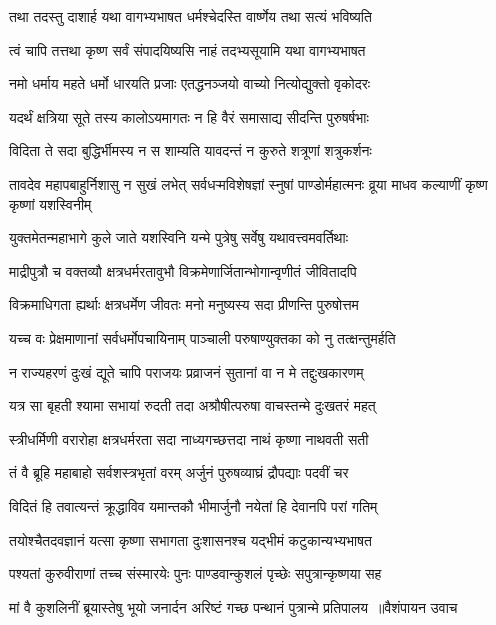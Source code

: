 \twolineshloka
{तथा तदस्तु दाशार्ह यथा वागभ्यभाषत}
{धर्मश्चेदस्ति वार्ष्णेय तथा सत्यं भविष्यति}


\twolineshloka
{त्वं चापि तत्तथा कृष्ण सर्वं संपादयिष्यसि}
{नाहं तदभ्यसूयामि यथा वागभ्यभाषत}


\twolineshloka
{नमो धर्माय महते धर्मो धारयति प्रजाः}
{एतद्धनञ्जयो वाच्यो नित्योद्युक्तो वृकोदरः}


\twolineshloka
{यदर्थं क्षत्रिया सूते तस्य कालोऽयमागतः}
{न हि वैरं समासाद्य सीदन्ति पुरुषर्षभाः}


\twolineshloka
{विदिता ते सदा बुद्धिर्भीमस्य न स शाम्यति}
{यावदन्तं न कुरुते शत्रूणां शत्रुकर्शनः}


\threelineshloka
{तावदेव महापबाहुर्निशासु न सुखं लभेत्}
{सर्वधऱ्मविशेषज्ञां स्नुषां पाण्डोर्महात्मनः}
{व्रूया माधव कल्याणीं कृष्ण कृष्णां यशस्विनीम्}


\twolineshloka
{युक्तमेतन्महाभागे कुले जाते यशस्विनि}
{यन्मे पुत्रेषु सर्वेषु यथावत्त्वमवर्तिथाः}


\twolineshloka
{माद्रीपुत्रौ च वक्तव्यौ क्षत्रधर्मरतावुभौ}
{विक्रमेणार्जितान्भोगान्वृणीतं जीवितादपि}


\twolineshloka
{विक्रमाधिगता ह्यर्थाः क्षत्रधर्मेण जीवतः}
{मनो मनुष्यस्य सदा प्रीणन्ति पुरुषोत्तम}


\twolineshloka
{यच्च वः प्रेक्षमाणानां सर्वधर्मोपचायिनाम्}
{पाञ्चाली परुषाण्युक्तका को नु तत्क्षन्तुमर्हति}


\twolineshloka
{न राज्यहरणं दुःखं द्यूते चापि पराजयः}
{प्रव्राजनं सुतानां वा न मे तद्दुःखकारणम्}


\twolineshloka
{यत्र सा बृहती श्यामा सभायां रुदती तदा}
{अश्रौषीत्परुषा वाचस्तन्मे दुःखतरं महत्}


\twolineshloka
{स्त्रीधर्मिणी वरारोहा क्षत्रधर्मरता सदा}
{नाध्यगच्छत्तदा नाथं कृष्णा नाथवती सती}


\twolineshloka
{तं वै ब्रूहि महाबाहो सर्वशस्त्रभृतां वरम्}
{अर्जुनं पुरुषव्याघ्रं द्रौपद्याः पदवीं चर}


\twolineshloka
{विदितं हि तवात्यन्तं क्रूद्धाविव यमान्तकौ}
{भीमार्जुनौ नयेतां हि देवानपि परां गतिम्}


\twolineshloka
{तयोश्चैतदवज्ञानं यत्सा कृष्णा सभागता}
{दुःशासनश्च यद्भीमं कटुकान्यभ्यभाषत}


\twolineshloka
{पश्यतां कुरुवीराणां तच्च संस्मारयेः पुनः}
{पाण्डवान्कुशलं पृच्छेः सपुत्रान्कृष्णया सह}


\threelineshloka
{मां वै कुशलिनीं ब्रूयास्तेषु भूयो जनार्दन}
{अरिष्टं गच्छ पन्थानं पुत्रान्मे प्रतिपालय ॥वैशंपायन उवाच}
{}


